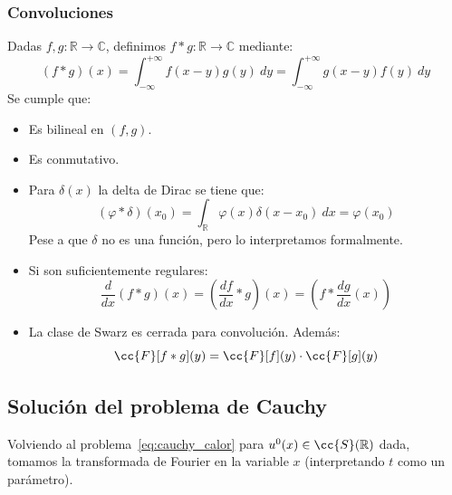 \subsubsection{Convoluciones}
\noindent
Dadas $f,g:\mathbb{R}\to\mathbb{C}$, definimos $f\ast g:\mathbb{R}\to\mathbb{C}$ mediante:
\begin{equation*}
    (f\ast g)(x) = \int_{-\infty}^{+\infty} f(x-y)g(y)~dy  = \int_{-\infty}^{+\infty} g(x-y)f(y)~dy 
\end{equation*}
Se cumple que:
\begin{itemize}
    \item Es bilineal en $(f,g)$.
    \item Es conmutativo.
    \item Para $\delta(x)$ la delta de Dirac se tiene que:
        \begin{equation*}
            (\varphi\ast \delta)(x_0) = \int_{\mathbb{R}} \varphi(x)\delta(x-x_0)~dx = \varphi(x_0)
        \end{equation*}
        Pese a que $\delta$ no es una función, pero lo interpretamos formalmente.
    \item Si son suficientemente regulares:
        \begin{equation*}
            \frac{d}{dx}(f\ast g)(x) = \left(\frac{d f}{dx}\ast g\right)(x) = \left(f\ast \frac{dg}{dx}(x)\right)
        \end{equation*}
    \item La clase de Swarz es cerrada para convolución. Además:
        \begin{equation*}
            \cc{F}[f\ast g](y) = \cc{F}[f](y)\cdot \cc{F}[g](y)
        \end{equation*}
\end{itemize}

\subsection{Solución del problema de Cauchy}
\noindent
Volviendo al problema~\eqref{eq:cauchy_calor} para $u^0(x)\in \cc{S}(\mathbb{R})$ dada, tomamos la transformada de Fourier en la variable $x$ (interpretando $t$ como un parámetro).\\


